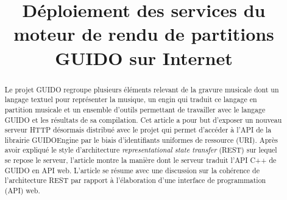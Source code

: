 \documentclass{article}
\title{Déploiement des services du moteur de rendu de partitions GUIDO sur Internet}
\date{}
\begin{document}
\maketitle

\begin{abstract}

Le projet GUIDO regroupe plusieurs éléments relevant de la gravure musicale dont un langage textuel pour représenter la musique, un engin qui traduit ce langage en partition musicale et un ensemble d'outils permettant de travailler avec le langage GUIDO et les résultats de sa compilation. Cet article a pour but d'exposer un nouveau serveur HTTP désormais distribué avec le projet qui permet d'accéder à l'API de la librairie GUIDOEngine par le biais d'identifiants uniformes de ressource (URI). Après avoir expliqué le style d'architecture \emph{representational state transfer} (REST) sur lequel se repose le serveur, l'article montre la manière dont le serveur traduit l'API C++ de GUIDO en API web. L'article se résume avec une discussion sur la cohérence de l'architecture REST par rapport à l'élaboration d'une interface de programmation (API) web.
\end{abstract}


\end{document}
